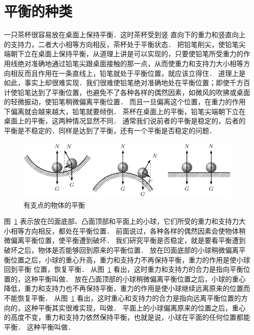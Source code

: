 \section{平衡的种类}
一只茶杯很容易放在桌面上保持平衡．这时茶杯受到竖
直向下的重力和竖直向上的支持力，二者大小相等方向相反，茶杯处于平衡状态．
把铅笔削尖，使铅笔尖端朝下立在桌面上保持平衡，从道理上讲是可以实现的，只要使铅笔所受重力的作用线绝对准确地通过铅笔尖跟桌面接触的那一点，从而使重力和支持力大小相等方向相反而且作用在一条直线上，铅笔就处于平衡位置，就应该立得住．
道理上是如此，事实上却很难实现．我们很难使铅笔绝对准确地处在平衡位置；即使千方百计使铅笔达到了平衡位置，也避免不了各种各样的偶然因素，如微风的吹拂或桌面的轻微振动，使铅笔稍微偏离平衡位置．
而且一旦偏离这个位置，在重力的作用下偏离就会越来越大，铅笔就要倾倒．
茶杯在桌面上的平衡，铅笔尖端朝下立在桌面上的平衡，这两种情况显然不同．
通常我们说前者的平衡是稳定的，后者的平衡是不稳定的．同样是达到了平衡，还有一个平衡是否稳定的问题．
\begin{figure}[htbp]
    \centering
    \includegraphics{fig/A/6-16.pdf}
    \caption{有支点的物体的平衡}\label{fig_A_6-16}
\end{figure}

图~\ref{fig_A_6-16} 表示放在凹面底部、凸面顶部和平面上的小球，它们所受的重力和支持力大小相等方向相反，都处在平衡位置．
前面说过，各种各样的偶然因素会使物体稍微偏离平衡位置，使平衡遭到破坏．
我们研究平衡是否稳定，就是要看平衡遭到破坏之后，物体是否能够回到原来的平衡位置．
放在凹面底部的小球稍微偏离平衡位置之后，小球的重心升高，重力和支持力不再保持平衡，重力的作用是使小球回到平衡
位置，恢复平衡．
从图~\ref{fig_A_6-16} 看出，这时重力和支持力的合力是指向平衡位置的，这种平衡叫做．
放在凸面顶部的小球稍微偏离平衡位置之后，小球的重心降低，重力和支持力也不再保持平衡，重力的作用是使小球继续远离原来的位置而不能恢复平衡．
从图~\ref{fig_A_6-16} 看出，这时重心和支持力的合力是指向远离平衡位置的方向的，这种平衡其实很难实现，叫做．
平面上的小球偏离原来的位置之后，重心的高度不变，重力和支持力依然保持平衡，也就是说，小球在平面的任何位置都能平衡．
这种平衡叫做．

